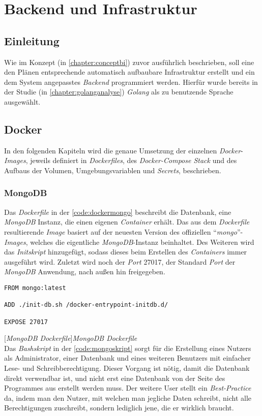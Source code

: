 
\section{Backend und Infrastruktur}

\subsection{Einleitung}
Wie im Konzept (in \autoref{chapter:conceptbi}) zuvor ausführlich beschrieben, soll eine den Plänen entsprechende automatisch aufbaubare Infrastruktur erstellt und ein dem System angepasstes \textit{Backend} programmiert werden. Hierfür wurde bereits in der Studie (in \autoref{chapter:golanganalyse}) \textit{Golang} als zu benutzende Sprache ausgewählt.
\subsection{Docker}

In den folgenden Kapiteln wird die genaue Umsetzung der einzelnen \textit{Docker}-\textit{Images}, jeweils definiert in \textit{Dockerfiles}, des \textit{Docker-Compose Stack} und des Aufbaus der Volumen, Umgebungsvariablen und \textit{Secrets}, beschrieben.

\subsubsection{MongoDB}

Das \textit{Dockerfile} in der \autoref{code:dockermongo} beschreibt die Datenbank, eine \textit{MongoDB} Instanz, die einen eigenen \textit{Container} erhält. Das aus dem \textit{Dockerfile} resultierende \textit{Image} basiert auf der neuesten Version des offiziellen \enquote{\textit{mongo}}-\textit{Images}, welches die eigentliche \textit{MongoDB}-Instanz beinhaltet. Des Weiteren wird das \textit{Initskript} hinzugefügt, sodass dieses beim Erstellen des \textit{Containers} immer ausgeführt wird. Zuletzt wird noch der \textit{Port} 27017, der Standard \textit{Port} der \textit{MongoDB} Anwendung, nach außen hin freigegeben.

\begin{verbatim}
FROM mongo:latest

ADD ./init-db.sh /docker-entrypoint-initdb.d/

EXPOSE 27017
\end{verbatim}
[\textit{MongoDB Dockerfile}]{\textit{MongoDB Dockerfile}}
\label{code:dockermongo}
~\\
Das \textit{Bashskript} in der \autoref{code:mongoskript} sorgt für die Erstellung eines Nutzers als Administrator, einer Datenbank und eines weiteren Benutzers mit einfacher Lese- und Schreibberechtigung. Dieser Vorgang ist nötig, damit die Datenbank direkt verwendbar ist, und nicht erst eine Datenbank von der Seite des Programmes aus erstellt werden muss. Der weitere User stellt ein \textit{Best-Practice} da, indem man den Nutzer, mit welchen man jegliche Daten schreibt, nicht alle Berechtigungen zuschreibt, sondern lediglich jene, die er wirklich braucht. 

